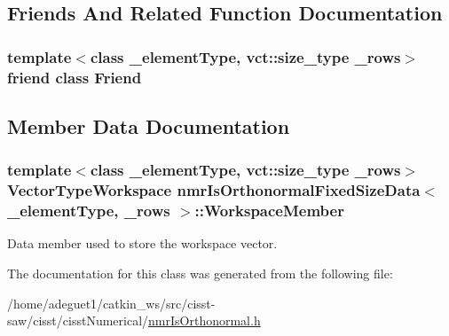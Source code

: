 \subsection{Friends And Related Function Documentation}
\hypertarget{classnmr_is_orthonormal_fixed_size_data_a7f8321d57e81bc613d5dbef3410ba70e}{
\subsubsection[{Friend}]{\setlength{\rightskip}{0pt plus 5cm}template$<$class \-\_\-element\-Type, vct\-::size\-\_\-type \-\_\-rows$>$ friend class {\bf Friend}\hspace{0.3cm}{\ttfamily [friend]}}}\label{classnmr_is_orthonormal_fixed_size_data_a7f8321d57e81bc613d5dbef3410ba70e}


\subsection{Member Data Documentation}
\hypertarget{classnmr_is_orthonormal_fixed_size_data_a482c2819e75c1c6fe359e7b22b6d1a63}{
\subsubsection[{Workspace\-Member}]{\setlength{\rightskip}{0pt plus 5cm}template$<$class \-\_\-element\-Type, vct\-::size\-\_\-type \-\_\-rows$>$ {\bf Vector\-Type\-Workspace} {\bf nmr\-Is\-Orthonormal\-Fixed\-Size\-Data}$<$ \-\_\-element\-Type, \-\_\-rows $>$\-::Workspace\-Member\hspace{0.3cm}{\ttfamily [protected]}}}\label{classnmr_is_orthonormal_fixed_size_data_a482c2819e75c1c6fe359e7b22b6d1a63}
Data member used to store the workspace vector. 

The documentation for this class was generated from the following file\-:\begin{DoxyCompactItemize}
\item 
/home/adeguet1/catkin\-\_\-ws/src/cisst-\/saw/cisst/cisst\-Numerical/\hyperlink{nmr_is_orthonormal_8h}{nmr\-Is\-Orthonormal.\-h}\end{DoxyCompactItemize}
